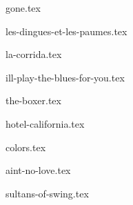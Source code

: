 \begin{songs}{}

  {gone.tex}
  \sclearpage

  {les-dingues-et-les-paumes.tex}
  \sclearpage

  {la-corrida.tex}
  \sclearpage

  {ill-play-the-blues-for-you.tex}
  \sclearpage

  {the-boxer.tex}
  \sclearpage

  {hotel-california.tex}
  \sclearpage

  {colors.tex}
  \sclearpage

  {aint-no-love.tex}
  \sclearpage
  
  {sultans-of-swing.tex}
  \sclearpage

 \end{songs}
